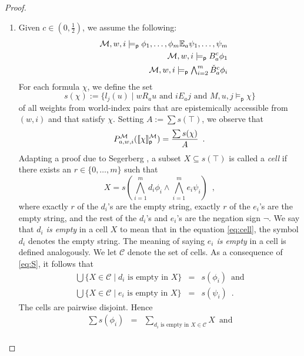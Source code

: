 \documentclass[12pt]{article}
\theoremstyle{definition}
\newcommand{\M}{{\cal M}}      %
\newcommand{\modelsp}{\models_{\mathsf{p}}}                  %
\newcommand{\semp}[1]{\llbracket{#1}\rrbracket_{\mathsf{p}}} %
\begin{document}
\begin{proof}
\begin{enumerate}
  \item Given $c\in(0,\frac 12)$, we assume the following:
    \begin{eqnarray}
      &&
      \M,w,i\modelsp \phi_1,\dots,\phi_m\mathbb{E}_a\psi_1,\dots,\psi_m
      \label{eq:S}
      \\
      &&
      \M,w,i\modelsp B^c_a\phi_1
      \label{eq:Bphi1}
      \\
      &&
      \textstyle \M,w,i\modelsp \bigwedge_{i=2}^m\check B^c_a\phi_i
      \label{eq:checkB}
    \end{eqnarray}
    For each formula $\chi$, we define the set
    \[
    s(\chi):=\{l_j(u)\mid wR_au \text{ and } iE_aj \text{ and }
    M,u,j\modelsp\chi\}
    \]
    of all weights from world-index pairs that are epistemically
    accessible from $(w,i)$ and that satisfy $\chi$. Setting $A:=\sum
    s(\top)$, we observe that
    \[
    P^\M_{a,w,i}(\semp{\chi}^\M)=\frac{\sum s(\chi)}A\enspace.
    \]
    Adapting a proof due to Segerberg \cite{Segerberg1971:qpiams}, a
    subset $X\subseteq s(\top)$ is called a \emph{cell} if there
    exists an $r\in\{0,\dots,m\}$ such that
    \begin{equation}
      \textstyle X=s(\bigwedge_{i=1}^m d_i\phi_i \land \bigwedge_{i=1}^m
      e_i\psi_i)\enspace,
      \label{eq:cell}
    \end{equation}
    where exactly $r$ of the $d_i$'s are the empty string, exactly $r$
    of the $e_i$'s are the empty string, and the rest of the $d_i$'s
    and $e_i$'s are the negation sign $\lnot$.  We say that
    \emph{$d_i$ is empty} in a cell $X$ to mean that in the equation
    \eqref{eq:cell}, the symbol $d_i$ denotes the empty string.  The
    meaning of saying \emph{$e_i$ is empty} in a cell is defined
    analogously. We let $\mathcal{C}$ denote the set of cells.  As a
    consequence of \eqref{eq:S}, it follows that
    \begin{eqnarray*}
      \textstyle \bigcup\{X\in\mathcal{C}\mid\text{$d_i$ is empty in
        $X$}\} 
      &=&
      s(\phi_i) \enspace\text{and}
      \\
      \textstyle
      \bigcup\{X\in\mathcal{C}\mid\text{$e_i$ is empty in $X$}\}
      &=&
      s(\psi_i) \enspace\text{.}
    \end{eqnarray*}
    The cells are pairwise disjoint.  Hence
    \begin{eqnarray*}
      \textstyle
      \sum s(\phi_i) &=&
      \sum_{\text{$d_i$ is empty in $X\in\mathcal{C}$}} X \enspace\text{and}
      \\

\end{eqnarray*}
\end{enumerate}
\end{proof}
\end{document}
